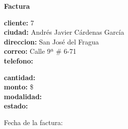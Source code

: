 \documentclass{article}
\begin{document}
\begin{center}
    {\LARGE \textbf{Factura}}\\[1cm]
\end{center}

\textbf{cliente:} 7 \\
\textbf{ciudad:} Andrés Javier Cárdenas García \\
\textbf{direccion:} San José del Fragua \\
\textbf{correo:} Calle 9ª # 6-71 \\
\textbf{telefono:}  \\

\vspace{0.5cm}

\textbf{cantidad:}  \\
\textbf{monto:} \$ \\
\textbf{modalidad:}  \\
\textbf{estado:}  \\

\vspace{1cm}

Fecha de la factura: 
\end{document}

